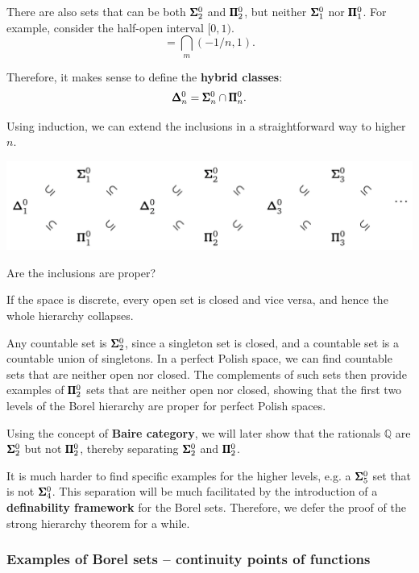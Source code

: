 There are also sets that can be both $\pmb{\Sigma}^0_2$ and $\pmb{\Pi}^0_2$, but neither $\pmb{\Sigma}^0_1$ nor $\pmb{\Pi}^0_1$. For example, consider the half-open interval $[0,1)$.
\begin{equation*}
[0,1) = \bigcup_n [0,1-1/n] = \bigcap_m (-1/n,1).
\end{equation*}

Therefore, it makes sense to define the \textbf{hybrid classes}:
\begin{equation*}
\pmb{\Delta}^0_n = \pmb{\Sigma}^0_n \cap \pmb{\Pi}^0_n.
\end{equation*}

Using induction, we can extend the inclusions in a straightforward way to higher $n$.

\begin{theorem}\label{thm-weak-borel-hierarchy}\includegraphics[width=0.7\linewidth]{files/weak_Borel-da4f6eea7acd328a1b820746fd4dbdf5.png}

\end{theorem}Are the inclusions are proper?

If the space is discrete, every open set is closed and vice versa, and hence the whole hierarchy collapses.

Any countable set is $\pmb{\Sigma}^0_2$, since a singleton set is closed, and a countable set is a countable union of singletons.
In a perfect Polish space, we can find countable sets that are neither open nor closed. The complements of such sets then provide examples of $\pmb{\Pi}^0_2$ sets that are neither open nor closed, showing that the first two levels of the Borel hierarchy are proper for perfect Polish spaces.

Using the concept of \textbf{Baire category}, we will later show that the rationals $\mathbb{Q}$ are $\pmb{\Sigma}^0_2$ but not $\pmb{\Pi}^0_2$, thereby separating $\pmb{\Sigma}^0_2$ and $\pmb{\Pi}^0_2$.

It is much harder to find specific examples for the higher levels, e.g. a $\pmb{\Sigma}^0_5$ set that is not $\pmb{\Sigma}^0_4$. This separation will be much facilitated by the introduction of a \textbf{definability framework} for the Borel sets. Therefore, we defer the proof of the strong hierarchy theorem for a while.

\subsubsection{Examples of Borel sets -- continuity points of functions}

